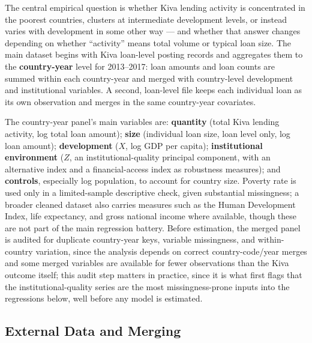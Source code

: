 \documentclass[12pt]{article}
\begin{document}
The central empirical question is whether Kiva lending activity is concentrated in the poorest
countries, clusters at intermediate development levels, or instead varies with development in some
other way --- and whether that answer changes depending on whether ``activity'' means total volume or
typical loan size. The main dataset begins with Kiva loan-level posting records
\citep{kiva_data} and aggregates them to the \textbf{country-year} level for 2013--2017: loan amounts
and loan counts are summed within each country-year and merged with country-level development and
institutional variables. A second, loan-level file keeps each individual loan as its own observation
and merges in the same country-year covariates.

The country-year panel's main variables are: \textbf{quantity} (total Kiva lending activity, log
total loan amount); \textbf{size} (individual loan size, loan level only, log loan amount);
\textbf{development} ($X$, log GDP per capita); \textbf{institutional environment} ($Z$, an
institutional-quality principal component, with an alternative index and a financial-access index as
robustness measures); and \textbf{controls}, especially log population, to account for country size.
Poverty rate is used only in a limited-sample descriptive check, given substantial missingness; a
broader cleaned dataset also carries measures such as the Human Development Index, life expectancy, and
gross national income where available, though these are not part of the main regression battery. Before
estimation, the merged panel is audited for duplicate country-year keys, variable missingness, and
within-country variation, since the analysis depends on correct country-code/year merges and some
merged variables are available for fewer observations than the Kiva outcome itself; this audit step
matters in practice, since it is what first flags that the institutional-quality series are the most
missingness-prone inputs into the regressions below, well before any model is estimated.

\subsection{External Data and Merging}
\end{document}
